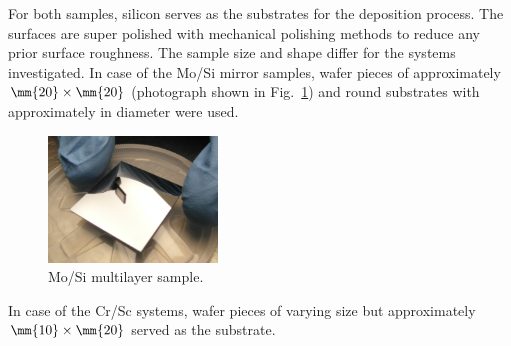 For both samples, silicon serves as the substrates for the deposition process. The surfaces are super polished with mechanical polishing methods to reduce any prior surface roughness. The sample size and shape differ for the systems investigated. In case of the Mo/Si mirror samples, wafer pieces of approximately $\mm{20} \times \mm{20}$ (photograph shown in Fig.~\ref{ch_exp:fig_mosi_sample}) and round substrates with approximately  in diameter were used.
\begin{figure}[htb]
        \includegraphics[width=0.4\textwidth]{img/SAM_1910_v1}
        \caption[Mo/Si multilayer sample.]{%
            Mo/Si multilayer sample.}
        \label{ch_exp:fig_mosi_sample}
\end{figure}
In case of the Cr/Sc systems, wafer pieces of varying size but approximately $\mm{10} \times \mm{20}$ served as the substrate.

